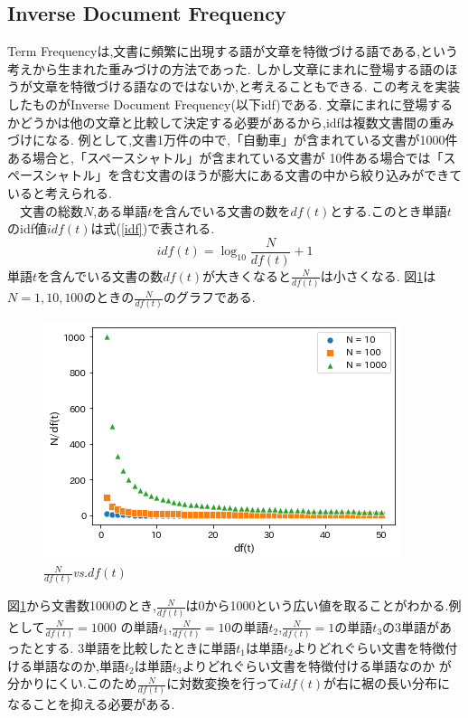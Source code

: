 \documentclass[a4j]{jarticle}
\begin{document}
\subsection{Inverse Document Frequency}
Term Frequencyは,文書に頻繁に出現する語が文章を特徴づける語である,という考えから生まれた重みづけの方法であった.
しかし文章にまれに登場する語のほうが文章を特徴づける語なのではないか,と考えることもできる.
この考えを実装したものがInverse Document Frequency(以下idf)である.
文章にまれに登場するかどうかは他の文章と比較して決定する必要があるから,idfは複数文書間の重みづけになる.
例として,文書1万件の中で,「自動車」が含まれている文書が1000件ある場合と,「スペースシャトル」が含まれている文書が
10件ある場合では「スペースシャトル」を含む文書のほうが膨大にある文書の中から絞り込みができていると考えられる.\\
　文書の総数$N$,ある単語$t$を含んでいる文書の数を$df(t)$とする.このとき単語$t$のidf値$idf(t)$は式(\ref{idf})で表される.
\begin{equation}
  idf(t) = \log_{10} \frac{N}{df(t)} +1 
  \label{idf}
\end{equation}
単語$t$を含んでいる文書の数$df(t)$が大きくなると$\frac{N}{df(t)}$は小さくなる.
図\ref{ndf}は$N=1,10,100$のときの$\frac{N}{df(t)}$のグラフである.
\begin{figure}[H]
  \centering
  \includegraphics[scale=0.75]{ndf.png}
  \caption{$\frac{N}{df(t)}${\it vs.}$df(t)$}
 \label{ndf}
\end{figure}
図\ref{ndf}から文書数1000のとき,$\frac{N}{df(t)}$は0から1000という広い値を取ることがわかる.例として$\frac{N}{df(t)}=1000$
の単語$t_1$,$\frac{N}{df(t)}=10$の単語$t_2$,$\frac{N}{df(t)}=1$の単語$t_3$の3単語があったとする.
3単語を比較したときに単語$t_1$は単語$t_2$よりどれぐらい文書を特徴付ける単語なのか,単語$t_2$は単語$t_3$よりどれぐらい文書を特徴付ける単語なのか
が分かりにくい.このため$\frac{N}{df(t)}$に対数変換を行って$idf(t)$が右に裾の長い分布になることを抑える必要がある.
\end{document}

